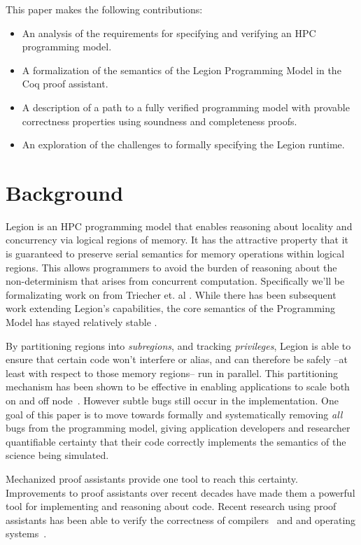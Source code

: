 \documentclass[sigconf]{acmart}
\begin{document}
This paper makes the following contributions:
\begin{itemize}
  \item An analysis of the requirements for specifying and verifying an HPC
    programming model. 
  \item A formalization of the semantics of the Legion Programming Model in the
    Coq proof assistant.
  \item A description of a path to a fully verified programming model with provable
    correctness properties using soundness and completeness proofs.
  \item An exploration of the challenges to formally specifying the Legion runtime.
\end{itemize}

\section{Background}

Legion is an HPC programming model that enables
reasoning about locality and concurrency via logical regions of memory. It has
the attractive property that it is guaranteed to preserve serial semantics for
memory operations within logical regions. This allows programmers to avoid the
burden of reasoning about the non-determinism that arises from concurrent
computation. Specifically we'll be formalizating work on from Triecher et.
al \cite{treichler2013language}. While there has been subsequent work extending
Legion's capabilities, the core semantics of the Programming Model has stayed relatively stable
\cite{slaughter2015regent, treichler2016dependent}. 

By partitioning regions into \emph{subregions}, and tracking \emph{privileges},
Legion is able to ensure that certain code won't interfere or alias, and can
therefore be safely --at least with respect to those memory regions-- run in
parallel. This partitioning mechanism has been shown to be effective in enabling
applications to scale both on and off node~\cite{bauer2012legion,
treichler2014realm}. However subtle bugs still occur 
 in the implementation. One goal of this paper is to move towards
formally and systematically removing \emph{all} bugs from the programming
model, giving application developers and researcher quantifiable certainty that
their code correctly implements the semantics of the science being simulated.

Mechanized proof assistants provide one tool to reach this certainty.
Improvements to proof assistants over recent decades have made them a powerful
tool for implementing and reasoning about code. Recent research using proof
assistants has been able to verify the correctness of compilers~\cite{leroy2012compcert} and 
and operating systems~\cite{gu2011certikos}.
\end{document}
